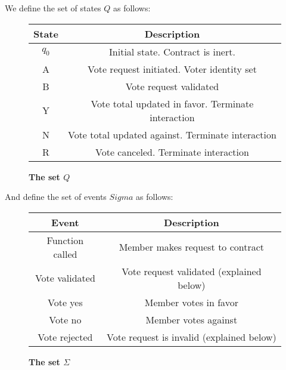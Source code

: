 \documentclass[conference]{IEEEtran}
\begin{document}
We define the set of states $Q$ as follows:
\begin{figure}[h]
\caption{\textbf{The set $Q$}}
\begin{center}
\begin{tabular}{|c|c|}
\hline
State & Description\\
\hline
$q_0$ & Initial state. Contract is inert.\\
\hline
A & Vote request initiated. Voter identity set\\
\hline
B & Vote request validated\\
\hline
Y & Vote total updated in favor. Terminate interaction \\
\hline
N & Vote total updated against. Terminate interaction\\
\hline
R & Vote canceled. Terminate interaction\\
\hline
\end{tabular}
\end{center}
\end{figure}

And define the set of events $Sigma$ as follows:
\begin{figure}[h]
\caption{\textbf{The set $\Sigma$}}
\begin{center}
\begin{tabular}{|c|c|}
\hline
Event & Description\\
\hline
Function called & Member makes request to contract\\
\hline
Vote validated & Vote request validated (explained below)\\
\hline
Vote yes & Member votes in favor \\
\hline
Vote no & Member votes against\\
\hline
Vote rejected & Vote request is invalid (explained below)\\
\hline
\end{tabular}
\end{center}
\end{figure}
\end{document}
